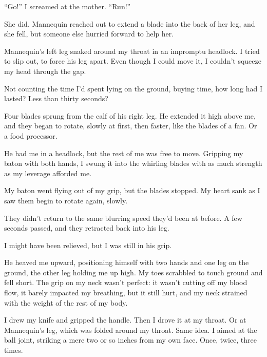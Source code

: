 ``Go!'' I screamed at the mother.  ``Run!''



She did.  Mannequin reached out to extend a blade into the back of her leg, and she fell, but someone else hurried forward to help her.



Mannequin's left leg snaked around my throat in an impromptu headlock.  I tried to slip out, to force his leg apart.  Even though I could move it, I couldn't squeeze my head through the gap.



Not counting the time I'd spent lying on the ground, buying time, how long had I lasted?  Less than thirty seconds?



Four blades sprung from the calf of his right leg.  He extended it high above me, and they began to rotate, slowly at first, then faster, like the blades of a fan.  Or a food processor.



He had me in a headlock, but the rest of me was free to move.  Gripping my baton with both hands, I swung it into the whirling blades with as much strength as my leverage afforded me.



My baton went flying out of my grip, but the blades stopped.  My heart sank as I saw them begin to rotate again, slowly.



They didn't return to the same blurring speed they'd been at before.  A few seconds passed, and they retracted back into his leg.



I might have been relieved, but I was still in his grip.



He heaved me upward, positioning himself with two hands and one leg on the ground, the other leg holding me up high.  My toes scrabbled to touch ground and fell short.  The grip on my neck wasn't perfect: it wasn't cutting off my blood flow, it barely impacted my breathing, but it still hurt, and my neck strained with the weight of the rest of my body.



I drew my knife and gripped the handle.  Then I drove it at my throat.  Or at Mannequin's leg, which was folded around my throat.  Same idea.  I aimed at the ball joint, striking a mere two or so inches from my own face.  Once, twice, three times.



